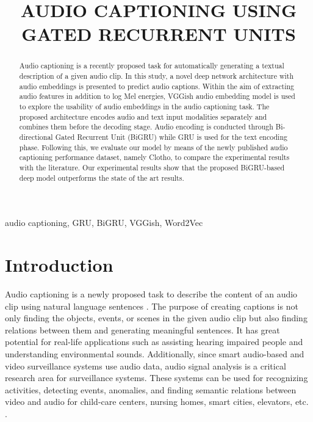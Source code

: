 \documentclass{article}
\begin{document}
\sloppy

\def\x{{\mathbf x}}
\def\L{{\cal L}}


\title{AUDIO CAPTIONING USING GATED RECURRENT UNITS}

\maketitle


\begin{abstract}
Audio captioning is a recently proposed task for automatically generating a textual description of a given audio clip. In this study, a novel deep network architecture with audio embeddings is presented to predict audio captions. Within the aim of extracting audio features in addition to log Mel energies, VGGish audio embedding model is used to explore the usability of audio embeddings in the audio captioning task. The proposed architecture encodes audio and text input modalities separately and combines them before the decoding stage. Audio encoding is conducted through Bi-directional Gated Recurrent Unit (BiGRU) while GRU is used for the text encoding phase. Following this, we evaluate our model by means of the newly published audio captioning performance dataset, namely Clotho, to compare the experimental results with the literature. Our experimental results show that the proposed BiGRU-based deep model outperforms the state of the art results.
\end{abstract}
\begin{keywords}
audio captioning, GRU, BiGRU, VGGish, Word2Vec
\end{keywords}
\section{Introduction}
\label{sec:intro}

Audio captioning is a newly proposed task to describe the content of an audio clip using natural language sentences \cite{DBLP:journals/corr/DrossosAV17}. The purpose of creating captions is not only finding the objects, events, or scenes in the given audio clip but also finding relations between them and generating meaningful sentences. It has great potential for real-life applications such as assisting hearing impaired people and understanding environmental sounds. Additionally, since smart audio-based and video surveillance systems use audio data, audio signal analysis is a critical research area for surveillance systems. These systems can be used for recognizing activities, detecting events, anomalies, and finding semantic relations between video and audio for child-care centers, nursing homes, smart cities, elevators, etc. \cite{DBLP:journals/corr/CroccoCTM14,10.1145/3322240,8633626}. 
\end{document}
